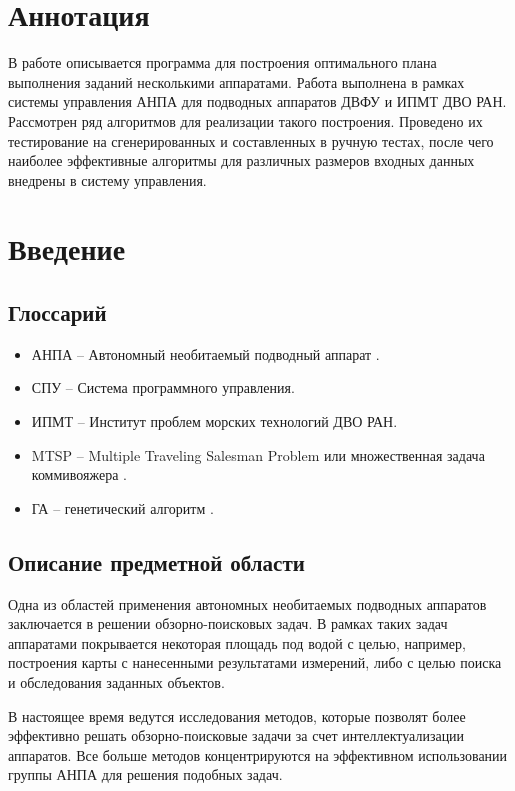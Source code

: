 \documentclass[a4paper,14pt,russian]{article}
\begin{document}
\tableofcontents
\newpage

\section*{Аннотация}

В работе описывается программа для построения оптимального плана выполнения заданий несколькими аппаратами. Работа выполнена в рамках системы управления АНПА для подводных аппаратов ДВФУ и ИПМТ ДВО РАН. Рассмотрен ряд алгоритмов для реализации такого построения. Проведено их тестирование на сгенерированных и составленных в ручную тестах, после чего наиболее эффективные алгоритмы для различных размеров входных данных внедрены в систему управления.

\section{Введение}
\subsection{Глоссарий}
\begin{itemize}
\item АНПА -- Автономный необитаемый подводный аппарат \cite{auv}.
\item СПУ -- Система программного управления.
\item ИПМТ -- Институт проблем морских технологий ДВО РАН.
\item MTSP -- Multiple Traveling Salesman Problem или множественная задача коммивояжера \cite{bektas2006multiple}.
\item ГА -- генетический алгоритм \cite{ga}.
\end{itemize}

\subsection{Описание предметной области}

Одна из областей применения автономных необитаемых подводных аппаратов заключается в решении обзорно-поисковых задач. В рамках таких задач аппаратами покрывается некоторая площадь под водой с целью, например, построения карты с нанесенными результатами измерений, либо с целью поиска и обследования заданных объектов.

В настоящее время ведутся исследования методов, которые позволят более эффективно решать обзорно-поисковые задачи за счет интеллектуализации аппаратов.
Все больше методов концентрируются на эффективном использовании группы АНПА для решения подобных задач.
\end{document}
